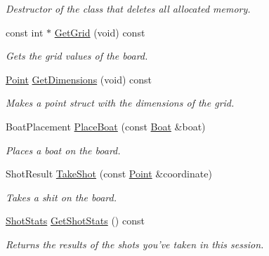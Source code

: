 \begin{DoxyCompactItemize}
\begin{DoxyCompactList}\small\item\em Destructor of the class that deletes all allocated memory. \end{DoxyCompactList}\item 
const int $\ast$ \hyperlink{class_c_s170_1_1_war_boats_1_1_ocean_a6b7459821811e3338724388f3e4c6a91}{Get\-Grid} (void) const 
\begin{DoxyCompactList}\small\item\em Gets the grid values of the board. \end{DoxyCompactList}\item 
\hyperlink{struct_c_s170_1_1_war_boats_1_1_point}{Point} \hyperlink{class_c_s170_1_1_war_boats_1_1_ocean_a7decdd1fb8f8ec107f4d909dba221290}{Get\-Dimensions} (void) const 
\begin{DoxyCompactList}\small\item\em Makes a point struct with the dimensions of the grid. \end{DoxyCompactList}\item 
Boat\-Placement \hyperlink{class_c_s170_1_1_war_boats_1_1_ocean_a4637bc3cc8dbb84f787d0af5a469629d}{Place\-Boat} (const \hyperlink{struct_c_s170_1_1_war_boats_1_1_boat}{Boat} \&boat)
\begin{DoxyCompactList}\small\item\em Places a boat on the board. \end{DoxyCompactList}\item 
Shot\-Result \hyperlink{class_c_s170_1_1_war_boats_1_1_ocean_aee6e2778bfc6ebe7aea804d189469bd6}{Take\-Shot} (const \hyperlink{struct_c_s170_1_1_war_boats_1_1_point}{Point} \&coordinate)
\begin{DoxyCompactList}\small\item\em Takes a shit on the board. \end{DoxyCompactList}\item 
\hyperlink{struct_c_s170_1_1_war_boats_1_1_shot_stats}{Shot\-Stats} \hyperlink{class_c_s170_1_1_war_boats_1_1_ocean_aa9c0ac3fcdb5184cfeadb7851aeef351}{Get\-Shot\-Stats} () const 
\begin{DoxyCompactList}\small\item\em Returns the results of the shots you've taken in this session. \end{DoxyCompactList}\end{DoxyCompactItemize}
